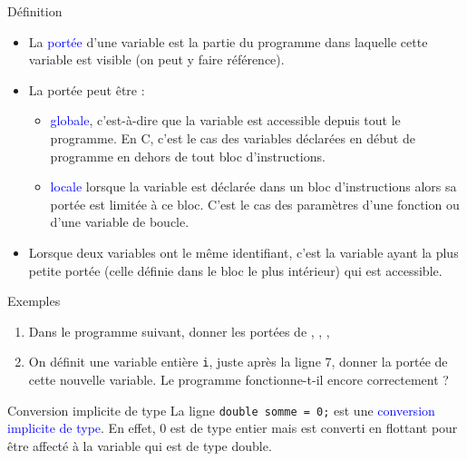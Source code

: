 \documentclass[10pt]{beamer}
\begin{document}
\begin{frame}{\Ctitle}{\stitle}
	\begin{alertblock}{Définition}
		\begin{itemize}
			\item<1-> La \textcolor{blue}{portée} d'une variable est la partie du programme dans laquelle cette variable est visible (on peut y faire référence).
			\item<2-> La portée peut être :
				\begin{itemize}
					\item<3-> \textcolor{blue}{globale}, c'est-à-dire que la variable est accessible depuis tout le programme. En C, c'est le cas des variables déclarées en début de programme en dehors de tout bloc d'instructions.
					\item<4-> \textcolor{blue}{locale} lorsque la variable est déclarée dans un bloc d'instructions alors sa portée est limitée à ce bloc. C'est le cas des paramètres d'une fonction ou d'une variable de boucle.
				\end{itemize}
			\item<5-> Lorsque deux variables ont le même identifiant, c'est la variable ayant la plus petite portée (celle définie dans le bloc le plus intérieur) qui est accessible.
		\end{itemize}
	\end{alertblock}
\end{frame}

\begin{frame}[fragile]{\Ctitle}{\stitle}
	\begin{exampleblock}{Exemples}
		\begin{enumerate}
		\item<1->{\small Dans le programme suivant, donner les portées de , , , }
		\item<2->{\small On définit une variable entière {\tt i}, juste après la ligne 7, donner la portée de cette nouvelle variable. Le programme fonctionne-t-il encore correctement ?}
		\end{enumerate}
	\end{exampleblock}
\end{frame}


\begin{frame}[fragile]{\Ctitle}{\stitle}

	\begin{block}{Conversion implicite de type}
		La ligne \texttt{double somme = 0;} est une \textcolor{blue}{conversion implicite de type}. En effet, 0 est de type entier mais est converti en flottant pour être affecté à la variable  qui est de type double.
	\end{block}
\end{frame}
\end{document}
